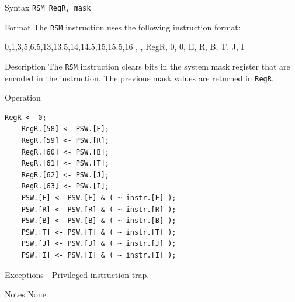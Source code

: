 %
%
\pagebreak
{}

\begin{iPageDescEntry}{Syntax}
    \texttt{RSM RegR, mask}
\end{iPageDescEntry}

\begin{iPageDescEntry}{Format}
    The \texttt{RSM} instruction uses the following instruction format: \\

    \begin{flushleft}
    \drawInstrFormat
        {0,1,3,5,6.5,13,13.5,14,14.5,15,15.5,16}
        {\OpCodeGrpSYS, \OpCodeRSM, RegR, 0, 0, E, R, B, T, J, I}
    \end{flushleft}
    
\end{iPageDescEntry}

\begin{iPageDescEntry}{Description}
    The \texttt{RSM} instruction clears bits in the system
    mask register that are encoded in the instruction. The previous mask values are returned in \texttt{RegR}.
\end{iPageDescEntry}

\begin{iPageDescOpEntry}{Operation}
	\begin{lstlisting}[style=iPageOpStyle]
	RegR <- 0;
	RegR.[58] <- PSW.[E];
	RegR.[59] <- PSW.[R];
	RegR.[60] <- PSW.[B];
	RegR.[61] <- PSW.[T];
	RegR.[62] <- PSW.[J];
	RegR.[63] <- PSW.[I];
	PSW.[E] <- PSW.[E] & ( ~ instr.[E] );
	PSW.[R] <- PSW.[R] & ( ~ instr.[R] );
	PSW.[B] <- PSW.[B] & ( ~ instr.[B] );
	PSW.[T] <- PSW.[T] & ( ~ instr.[T] );
	PSW.[J] <- PSW.[J] & ( ~ instr.[J] );
	PSW.[I] <- PSW.[I] & ( ~ instr.[I] );  
	\end{lstlisting}
\end{iPageDescOpEntry}

\begin{iPageDescEntry}{Exceptions}
    - Privileged instruction trap.
\end{iPageDescEntry}

\begin{iPageDescEntry}{Notes}
     None.
\end{iPageDescEntry}
